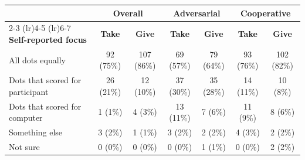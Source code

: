\begingroup\small\setlength{\tabcolsep}{4pt}
\begin{tabular*}{\linewidth}{@{\extracolsep{\fill}}lcccccc}
   \toprule
   & \multicolumn{2}{c}{\textbf{Overall}} & \multicolumn{2}{c}{\textbf{Adversarial}} & \multicolumn{2}{c}{\textbf{Cooperative}}\\
   \cmidrule(lr){2-3} \cmidrule(lr){4-5} \cmidrule(lr){6-7}
   \textbf{Self-reported focus} & \textbf{Take} & \textbf{Give} & \textbf{Take} & \textbf{Give} & \textbf{Take} & \textbf{Give}\\
   \midrule
   All dots equally & 92 (75\%) & 107 (86\%) & 69 (57\%) & 79 (64\%) & 93 (76\%) & 102 (82\%)\\
   Dots that scored for participant & 26 (21\%) & 12 (10\%) & 37 (30\%) & 35 (28\%) & 14 (11\%) & 10 (8\%)\\
   Dots that scored for computer & 1 (1\%) & 4 (3\%) & 13 (11\%) & 7 (6\%) & 11 (9\%) & 8 (6\%)\\
   Something else & 3 (2\%) & 1 (1\%) & 3 (2\%) & 2 (2\%) & 4 (3\%) & 2 (2\%)\\
   Not sure & 0 (0\%) & 0 (0\%) & 0 (0\%) & 1 (1\%) & 0 (0\%) & 2 (2\%)\\
   \bottomrule
\end{tabular*}
\par\endgroup
